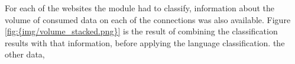 
For each of the websites the module had to classify, information about the volume of consumed data on each of the connections was also available. 
Figure \ref{fig:{img/volume_stacked.png}} is the result of combining the classification results with that information, before applying the language classification.
the other data, 
